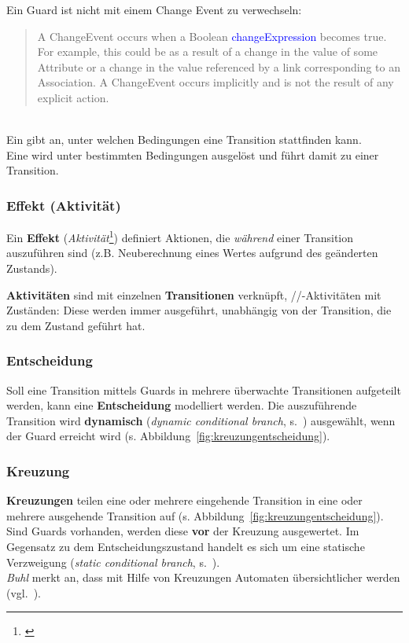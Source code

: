 \begin{tcolorbox}
    Ein Guard ist nicht mit einem Change Event zu verwechseln:\\

    \blockquote[{\cite[292]{OMG17}}]{
        A ChangeEvent occurs when a Boolean \textcolor{blue}{changeExpression} becomes true. For example, this could be as a result of a
        change in the value of some Attribute or a change in the value referenced by a link corresponding to an Association. A
        ChangeEvent occurs implicitly and is not the result of any explicit action.
    }\\

    \noindent
    Ein  gibt an, unter welchen Bedingungen eine Transition stattfinden kann.\\
    Eine  wird unter bestimmten Bedingungen ausgelöst und führt damit zu einer Transition.
\end{tcolorbox}

\subsubsection*{Effekt (Aktivität)}
Ein \textbf{Effekt} (\textit{Aktivität}\footnote{\cite[88]{Bal05}}) definiert Aktionen, die \textit{während} einer Transition auszuführen sind (z.B. Neuberechnung eines Wertes aufgrund des geänderten Zustands).\\

\begin{tcolorbox}
    \textbf{Aktivitäten} sind mit einzelnen \textbf{Transitionen} verknüpft, //-Aktivitäten mit Zuständen: Diese werden immer ausgeführt, unabhängig von der Transition, die zu dem Zustand geführt hat.
\end{tcolorbox}

\subsubsection*{Entscheidung}
Soll eine Transition mittels Guards in mehrere überwachte Transitionen aufgeteilt werden, kann eine \textbf{Entscheidung} modelliert werden.
Die auszuführende Transition wird \textbf{dynamisch} (\textit{dynamic conditional branch}, s.~\cite[339 f.]{Bal05}) ausgewählt, wenn der Guard erreicht wird (s. Abbildung~\ref{fig:kreuzungentscheidung}).


\subsubsection*{Kreuzung}
\textbf{Kreuzungen} teilen eine oder mehrere eingehende Transition in eine oder mehrere ausgehende Transition auf (s. Abbildung~\ref{fig:kreuzungentscheidung}).\\
Sind Guards vorhanden, werden diese \textbf{vor} der Kreuzung ausgewertet.
Im Gegensatz zu dem Entscheidungszustand handelt es sich um eine statische Verzweigung (\textit{static conditional branch}, s.~\cite[340]{Bal05}).\\
\textit{Buhl} merkt an, dass mit Hilfe von Kreuzungen Automaten übersichtlicher werden (vgl.~\cite[73]{Buh09}).

